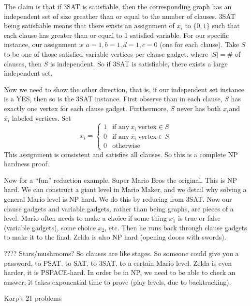The claim is that if 3SAT is satisfiable, then the corresponding graph has an independent set of size greather than or equal to the number of clauses. 3SAT being satisfiable means that there exists an assignment  of $x_i  $ to $\{0,1\} $ such that each clause has greater than or equal to 1 satisfied variable. For our specific instance, our assignment is $a=1,b=1,d=1,c=0$ (one for each clause). Take $S$ to be one of those satisfied variable vertices per clause gadget, where $|S|=\# $ of clauses, then $S$ is independent. So if 3SAT is satisfiable, there exists a large independent set.

Now we need to show the other direction, that is, if our independent set instance is a YES, then so is the 3SAT instance. First observe than in each clause, $S$ has exactly one vertex for each clause gadget. Furthermore, $S$ never has both $x_i $and $\overline{x}_i $ labeled vertices. Set \[
x_i =
\begin{cases}
    1 & \text{if any} \ x_i  \ \text{vertex} \in S\\
    0 & \text{if any} \ \overline{x}_i  \ \text{vertex} \in S\\
    0 & \text{otherwise} 
\end{cases}
\]This assignment is consistent and satisfies all clauses. So this is a complete NP hardness proof. 

\begin{example}[Mario]
    Now for a ``fun'' reduction example, Super Mario Bros the original. This is NP hard. We can construct a giant level in Mario Maker, and we detail why solving a general Mario level is NP hard. We do this by reducing from 3SAT. Now our clause gadgets and variable gadgets, rather than being graphs, are pieces of a level. Mario often needs to make a choice if some thing $x_1$ is true or false (variable gadgets), some choice $x_2$, etc. Then he runs back through clause gadgets to make it to the final. Zelda is also NP hard (opening doors with swords).
    
    ???? Stars/mushrooms? So clauses are like stages. So someone could give you a password, to PSAT, to SAT, to 3SAT, to a certain Mario level. Zelda is even harder, it is PSPACE-hard. In order be in NP, we need to be able to check an answer; it takes exponential time to prove (play levels, due to backtracking).
\end{example}
Karp's 21 problems
